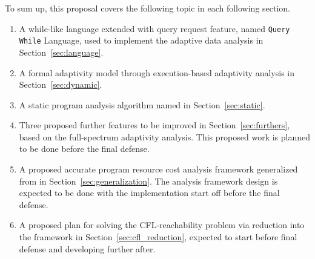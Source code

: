 To sum up, this proposal covers the following topic in each following section.
\begin{enumerate}
\item A while-like language extended with query request feature, named {\tt Query While} Language, 
used to implement 
the adaptive data analysis in Section~\ref{sec:language}.
\item A formal adaptivity model through execution-based adaptivity analysis in Section~\ref{sec:dynamic}.
\item A static program analysis algorithm named {\THESYSTEM} in Section~\ref{sec:static}.
\item Three proposed further features to be improved in Section~\ref{sec:furthers}, 
based on the 
 full-spectrum adaptivity analysis.
 This proposed work is planned to be done before the final defense.
\item A proposed accurate program resource cost analysis framework generalized from {\THESYSTEM} in Section~\ref{sec:generalization}. 
The analysis framework design is expected to be done with the implementation start off before the final defense.
\item A proposed plan for solving the CFL-reachability problem via reduction into the {\THESYSTEM} framework in Section~\ref{sec:cfl_reduction},
expected to start before final defense and developing further after.
\end{enumerate}